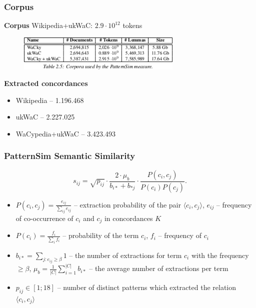 \begin{frame}
\frametitle{Corpus}

\textbf{Corpus} Wikipedia+ukWaC: $2.9\cdot10^{12}$ tokens

\begin{figure}  
\centering
\includegraphics[width=0.7\textwidth]{figures/patternsim-table}
\end{figure}


\textbf{Extracted concordances}

\begin{itemize}
  \item Wikipedia -- 1.196.468 
  \item ukWaC -- 2.227.025 
  \item WaCypedia+ukWaC -- 3.423.493
\end{itemize}

\end{frame}





\begin{frame}
\frametitle{PatternSim Semantic Similarity}

  
$$s_{ij} = \sqrt{p_{ij}} \cdot \frac{2\cdot\mu_b }{b_{i*}+b_{*j}} \cdot \frac{P(c_i,c_j)}{P(c_i)P(c_j)}.$$


\begin{itemize}


\item $P(c_i,c_j)=\frac{e_{ij}}{\sum_{ij}e_{ij}}$ -- extraction probability of the pair $\langle c_i,c_j \rangle$, $e_{ij}$ --  frequency of co-occurrence of $c_i$ and $c_j$ in concordances $K$ 

\item $P(c_i)= \frac{f_i}{\sum_i f_i}$ -- probability of the term $c_i$, $f_i$ -- frequency of $c_i$ 
\item $b_{i*} = \sum_{j:e_{ij} \geq \beta} 1$ -- the number of extractions for term $c_i$ with the frequency $\geq \beta$, $\mu_b = \frac{1}{|C|}\sum_{i=1}^{|C|} b_{i*}$ -- the average number of extractions per term

\item $p_{ij} \in [1;18]$ -- number of distinct patterns which extracted the relation $\langle c_i, c_j \rangle$
  
 
\end{itemize}

\end{frame}




